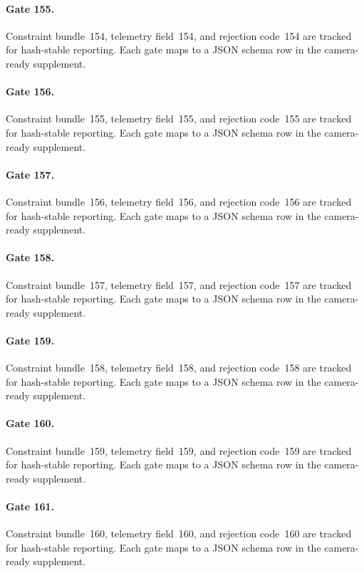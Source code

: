 \documentclass[sigconf,nonacm]{acmart}
\begin{document}
\paragraph{Gate 155.}
Constraint bundle~154, telemetry field~154, and rejection code~154 are tracked for hash-stable reporting. Each gate maps to a JSON schema row in the camera-ready supplement. %

\paragraph{Gate 156.}
Constraint bundle~155, telemetry field~155, and rejection code~155 are tracked for hash-stable reporting. Each gate maps to a JSON schema row in the camera-ready supplement. %

\paragraph{Gate 157.}
Constraint bundle~156, telemetry field~156, and rejection code~156 are tracked for hash-stable reporting. Each gate maps to a JSON schema row in the camera-ready supplement. %

\paragraph{Gate 158.}
Constraint bundle~157, telemetry field~157, and rejection code~157 are tracked for hash-stable reporting. Each gate maps to a JSON schema row in the camera-ready supplement. %

\paragraph{Gate 159.}
Constraint bundle~158, telemetry field~158, and rejection code~158 are tracked for hash-stable reporting. Each gate maps to a JSON schema row in the camera-ready supplement. %

\paragraph{Gate 160.}
Constraint bundle~159, telemetry field~159, and rejection code~159 are tracked for hash-stable reporting. Each gate maps to a JSON schema row in the camera-ready supplement. %

\paragraph{Gate 161.}
Constraint bundle~160, telemetry field~160, and rejection code~160 are tracked for hash-stable reporting. Each gate maps to a JSON schema row in the camera-ready supplement. %
\end{document}
